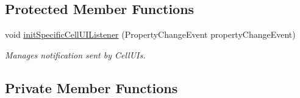 \subsection*{Protected Member Functions}
\begin{DoxyCompactItemize}
\item 
void \hyperlink{classbattleship2D_1_1ui_1_1BoardUIComputer_ab01227e9e77399e740e47aa21cd6e176}{init\-Specific\-Cell\-U\-I\-Listener} (Property\-Change\-Event property\-Change\-Event)
\begin{DoxyCompactList}\small\item\em Manages notification sent by Cell\-U\-Is. \end{DoxyCompactList}\end{DoxyCompactItemize}
\subsection*{Private Member Functions}
